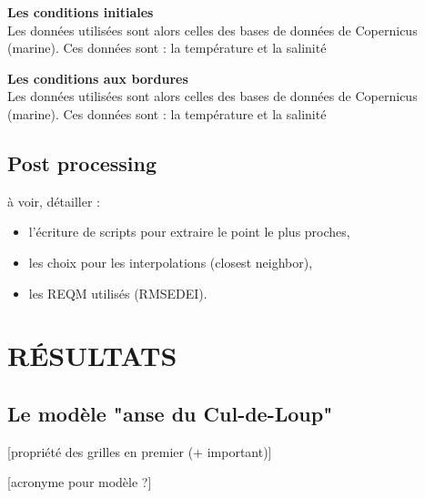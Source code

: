 \documentclass[10pt,a4paper,titlepage]{article}
\begin{document}
    
    \textbf{Les conditions initiales}\\
    \label{par:cond_init}
    Les données utilisées sont alors celles des bases de données de Copernicus (marine).
    Ces données sont : la température et la salinité %
    
    
    \textbf{Les conditions aux bordures}\\
    \label{par:cond_bords}
    Les données utilisées sont alors celles des bases de données de Copernicus (marine).
    Ces données sont : la température et la salinité %
    
    
    \subsection{Post processing}
    \label{sub:postpro}
    à voir, détailler :
    \begin{itemize}
        \item l'écriture de scripts pour extraire le point le plus proches,
        \item les choix pour les interpolations (closest neighbor),
        \item les REQM utilisés (RMSEDEI).
    \end{itemize}
    
    
    \newpage
    \section{RÉSULTATS}
    \label{sec:resultats}
    
    
    \subsection{Le modèle "anse du Cul-de-Loup"}
    \label{sub:modele_ADCL}
    
    [propriété des grilles en premier (+ important)]
    
    [acronyme pour modèle ?]
    
    
\end{document}
